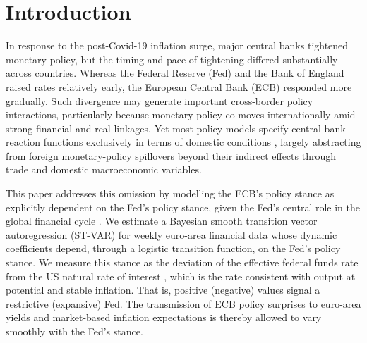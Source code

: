\section{Introduction}\label{sec:introduction}

In response to the post-Covid-19 inflation surge, major central banks tightened monetary policy, but the timing and pace of tightening differed substantially across countries. Whereas the Federal Reserve (Fed) and the Bank of England raised rates relatively early, the European Central Bank (ECB) responded more gradually. Such divergence may generate important cross-border policy interactions, particularly because monetary policy co-moves internationally amid strong financial and real linkages. Yet most policy models specify central-bank reaction functions exclusively in terms of domestic conditions \citep[see, e.g.,][]{del2013frbny}, largely abstracting from foreign monetary-policy spillovers beyond their indirect effects through trade and domestic macroeconomic variables. 

This paper addresses this omission by modelling the ECB's policy stance as explicitly dependent on the Fed's policy stance, given the Fed's central role in the global financial cycle \citep{miranda2020us}. We estimate a Bayesian smooth transition vector autoregression (ST-VAR) for weekly euro-area financial data whose dynamic coefficients depend, through a logistic transition function, on the Fed's policy stance. We measure this stance as the deviation of the effective federal funds rate from the US natural rate of interest \citep{laubach2003measuring}, which is the rate consistent with output at potential and stable inflation. That is, positive (negative) values signal a restrictive (expansive) Fed. The transmission of ECB policy surprises to euro-area yields and market-based inflation expectations is thereby allowed to vary smoothly with the Fed's stance.

